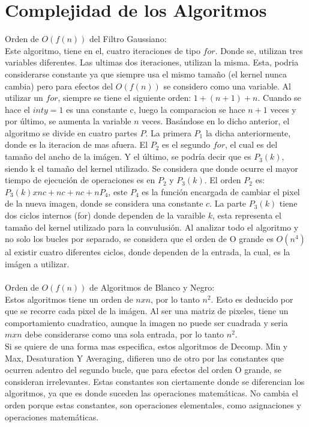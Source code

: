 \documentclass[conference]{IEEEtran}
\begin{document}
\section{Complejidad de los Algoritmos}
Orden de $O(f(n))$ del Filtro Gaussiano:\\
Este algoritmo, tiene en el, cuatro iteraciones de tipo $for$. Donde se, utilizan tres variables diferentes. Las ultimas dos iteraciones, utilizan la misma. Esta, podria considerarse constante ya que siempre usa el mismo tamaño (el kernel nunca cambia) pero para efectos del $O(f(n))$ se considero como una variable.  Al utilizar un $for$, siempre se tiene el siguiente orden: $1 + (n+1) + n$.  Cuando se hace el $int y = 1$ es una constante c, luego la comparacion se hace $n+1$ veces y por \'ultimo, se aumenta la variable $n$ veces. Bas\'andose en lo dicho anterior, el algoritmo se divide en cuatro partes $P$. La primera $P_1$ la dicha anteriormente, donde es la iteracion de mas afuera. El $P_2$ es el segundo $for$, el cual es del tamaño del ancho de la im\'agen. Y el \'ultimo, se podr\'ia decir que es $P_3(k)$, siendo k el tamaño del kernel utilizado. Se considera que donde ocurre el mayor tiempo de ejecuci\'on de operaciones es en $P_2$ y $P_3(k)$. El orden $P_2$ es: $P_3(k) x nc + nc + nc + nP_4 
$, este $P_4$ es la funci\'on encargada de cambiar el pixel de la nueva imagen, donde se considera una constante $c$.  La parte $P_3(k) $ tiene dos ciclos internos (for) donde dependen de la varaible $k $, esta representa el tamaño del kernel utilizado para la convulusi\'on. Al analizar todo el algoritmo y no solo los bucles por separado, se considera que el orden de O grande es $O(n^4)$ al existir cuatro diferentes ciclos, donde dependen de la entrada, la cual, es la im\'agen a utilizar. \\
\\
Orden de $O(f(n))$ de Algoritmos de Blanco y Negro:\\
Estos algoritmos tiene un orden de $nxn$, por lo tanto $n^2$. Esto es deducido por que se recorre cada pixel de la im\'agen. Al ser una matriz de pixeles, tiene un comportamiento cuadratico, aunque la imagen no puede ser cuadrada y seria $mxn $ debe considerarse como una sola entrada, por lo tanto $n^2$.
\\Si se quiere de una forma mas especifica, estos algoritmos de Decomp. Min y Max, Desaturation Y Averaging, difieren uno de otro por las constantes que ocurren adentro del segundo bucle, que para efectos del orden O grande, se consideran irrelevantes. Estas constantes son ciertamente donde se diferencian los algoritmos, ya que es donde suceden las operaciones matem\'aticas. No cambia el orden porque estas constantes, son operaciones elementales, como asignaciones y operaciones matem\'aticas. 
\end{document}
